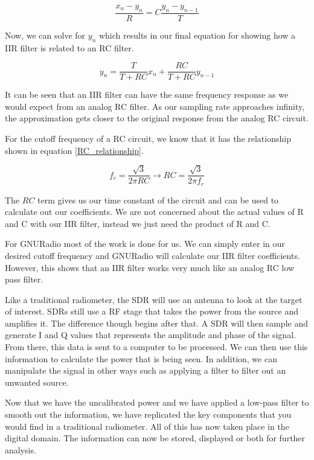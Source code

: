 \begin{equation}\label{diff_xn_yn}
\frac{x_n-y_n}{R}=C\frac{y_n-y_{n-1}}{T}
\end{equation}

Now, we can solve for $y_n$ which results in our final equation for showing how a IIR filter is related to an RC filter.

\begin{equation}\label{final_IIR_RC}
y_n=\frac{T}{T+RC}x_n+\frac{RC}{T+RC}y_{n-1}
\end{equation}

It can be seen that an IIR filter can have the same frequency response as we would expect from an analog RC filter.  As our sampling rate approaches infinity, the approximation gets closer to the original response from the analog RC circuit.  

For the cutoff frequency of a RC circuit, we know that it has the relationship shown in equation \ref{RC_relationship}.

\begin{equation}\label{RC_relationship}
f_c=\frac{\sqrt{3}}{2\pi RC}\rightarrow RC=\frac{\sqrt{3}}{2\pi f_c}
\end{equation}

The $RC$ term gives us our time constant of the circuit and can be used to calculate out our coefficients.  We are not concerned about the actual values of R and C with our IIR filter, instead we just need the product of R and C.  

For GNURadio most of the work is done for us.  We can simply enter in our desired cutoff frequency and GNURadio will calculate our IIR filter coefficients.  However, this shows that an IIR filter works very much like an analog RC low pass filter.

Like a traditional radiometer, the SDR will use an antenna to look at the target of interest.  SDRs still use a RF stage that takes the power from the source and amplifies it.  The difference though begins after that.  A SDR will then sample and generate I and Q values that represents the amplitude and phase of the signal.  From there, this data is sent to a computer to be processed.  We can then use this information to calculate the power that is being seen.  In addition, we can manipulate the signal in other ways such as applying a filter to filter out an unwanted source.

Now that we have the uncalibrated power and we have applied a low-pass filter to smooth out the information, we have replicated the key components that you would find in a traditional radiometer.  All of this has now taken place in the digital domain.  The information can now be stored, displayed or both for further analysis.  

